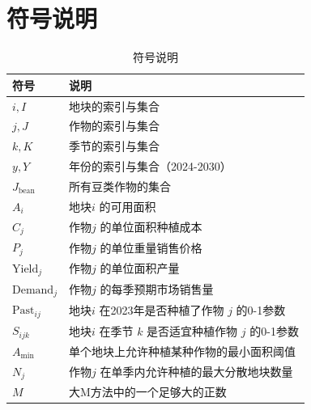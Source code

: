 \section{符号说明}

\begin{table}[H]
	\centering
	\caption{符号说明}
	\begin{tabular}{ll}
		\toprule
		符号                 & 说明                                \\
		\midrule

		$i, I$             & 地块的索引与集合                          \\
		$j, J$             & 作物的索引与集合                          \\
		$k, K$             & 季节的索引与集合                          \\
		$y, Y$             & 年份的索引与集合（2024-2030）               \\
		$J_{\text{bean}}$  & 所有豆类作物的集合                         \\

		$A_i$              & 地块$i$ 的可用面积                       \\
		$C_j$              & 作物$j$ 的单位面积种植成本                   \\
		$P_j$              & 作物$j$ 的单位重量销售价格                   \\
		$\text{Yield}_j$   & 作物$j$ 的单位面积产量                     \\
		$\text{Demand}_j$  & 作物$j$ 的每季预期市场销售量                  \\
		$\text{Past}_{ij}$ & 地块$i$ 在2023年是否种植了作物 $j$ 的0-1参数    \\
		$S_{ijk}$          & 地块$i$ 在季节 $k$ 是否适宜种植作物 $j$ 的0-1参数 \\
		$A_{\min}$         & 单个地块上允许种植某种作物的最小面积阈值              \\
		$N_j$              & 作物$j$ 在单季内允许种植的最大分散地块数量           \\
		$M$                & 大M方法中的一个足够大的正数                    \\
		\bottomrule
	\end{tabular}
\end{table}